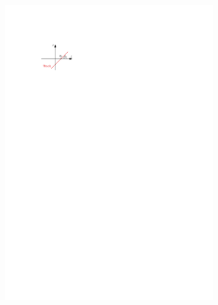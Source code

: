 \begin{figure}[htb]
  \begin{subfigure}[t]{0.48\textwidth}
    \centering
    \includegraphics{./figures/atlas/impact_params_z0.pdf}
    \label{fig:longitudinal_impact_param}
  \end{subfigure}\hfill
  \begin{subfigure}[t]{0.48\textwidth}
    \centering

\end{subfigure}
\end{figure}
